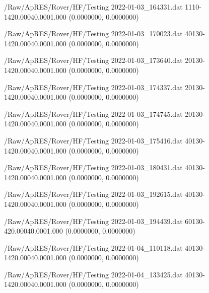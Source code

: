 \hfaprestable
{/Raw/ApRES/Rover/HF/Testing}%
{2022-01-03\_164331.dat}%
{1}{1}{10}{-14}{20.000}{40.000}{1.000}%
{ (0.0000000, 0.0000000)}%
{}%
{}%

\hfaprestable
{/Raw/ApRES/Rover/HF/Testing}%
{2022-01-03\_170023.dat}%
{40}{1}{30}{-14}{20.000}{40.000}{1.000}%
{ (0.0000000, 0.0000000)}%
{}%
{}%

\hfaprestable
{/Raw/ApRES/Rover/HF/Testing}%
{2022-01-03\_173640.dat}%
{20}{1}{30}{-14}{20.000}{40.000}{1.000}%
{ (0.0000000, 0.0000000)}%
{}%
{}%

\hfaprestable
{/Raw/ApRES/Rover/HF/Testing}%
{2022-01-03\_174337.dat}%
{20}{1}{30}{-14}{20.000}{40.000}{1.000}%
{ (0.0000000, 0.0000000)}%
{}%
{}%

\hfaprestable
{/Raw/ApRES/Rover/HF/Testing}%
{2022-01-03\_174745.dat}%
{20}{1}{30}{-14}{20.000}{40.000}{1.000}%
{ (0.0000000, 0.0000000)}%
{}%
{}%

\hfaprestable
{/Raw/ApRES/Rover/HF/Testing}%
{2022-01-03\_175416.dat}%
{40}{1}{30}{-14}{20.000}{40.000}{1.000}%
{ (0.0000000, 0.0000000)}%
{}%
{}%

\hfaprestable
{/Raw/ApRES/Rover/HF/Testing}%
{2022-01-03\_180431.dat}%
{40}{1}{30}{-14}{20.000}{40.000}{1.000}%
{ (0.0000000, 0.0000000)}%
{}%
{}%

\hfaprestable
{/Raw/ApRES/Rover/HF/Testing}%
{2022-01-03\_192615.dat}%
{40}{1}{30}{-14}{20.000}{40.000}{1.000}%
{ (0.0000000, 0.0000000)}%
{}%
{}%

\hfaprestable
{/Raw/ApRES/Rover/HF/Testing}%
{2022-01-03\_194439.dat}%
{60}{1}{30}{-4}{20.000}{40.000}{1.000}%
{ (0.0000000, 0.0000000)}%
{}%
{}%

\hfaprestable
{/Raw/ApRES/Rover/HF/Testing}%
{2022-01-04\_110118.dat}%
{40}{1}{30}{-14}{20.000}{40.000}{1.000}%
{ (0.0000000, 0.0000000)}%
{}%
{}%

\hfaprestable
{/Raw/ApRES/Rover/HF/Testing}%
{2022-01-04\_133425.dat}%
{40}{1}{30}{-14}{20.000}{40.000}{1.000}%
{ (0.0000000, 0.0000000)}%
{}%
{}%

